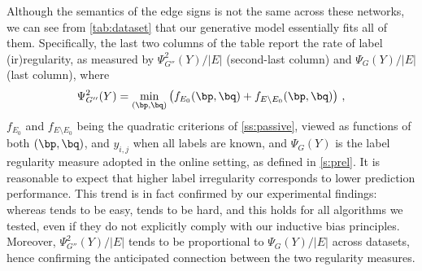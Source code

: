 Although the semantics of the edge signs is not the same across these networks, we can see from
\autoref{tab:dataset} that our generative model essentially fits all of them. Specifically, the last
two columns of the table report the rate of label (ir)regularity, as measured by
$\Psi^2_{G''}(Y)/|E|$ (second-last column) and $\Psi_{G}(Y)/|E|$ (last column), where 
\[
\Psi^2_{G''}(Y) = \min_{(\bp,\bq)} \left(f_{E_0}(\bp,\bq) + f_{E\setminus E_0}(\bp,\bq)\right)\,,
\]
$f_{E_0}$ and $f_{E\setminus E_0}$ being the quadratic criterions of \autoref{ss:passive}, viewed as
functions of both $(\bp,\bq)$, and $y_{i,j}$ when all labels are known, and $\Psi_{G}(Y)$ is the
label regularity measure adopted in the online setting, as defined in \autoref{s:prel}. It is
reasonable to expect that higher label irregularity corresponds to lower prediction performance.
This trend is in fact confirmed by our experimental findings: whereas \epi{} tends to be easy,
\aut{} tends to be hard, and this holds for all algorithms we tested, even if they do not explicitly
comply with our inductive bias principles. Moreover, $\Psi^2_{G''}(Y)/|E|$ tends to be proportional
to $\Psi_{G}(Y)/|E|$ across datasets, hence confirming the anticipated connection between the two
regularity measures.

\iffalse
***********************************************************************
Finally, there is a low fraction of reciprocal (or \emph{twin}) edges (i.e.\
$\eij \in E$ and $\eji \in E$, which is a common mechanism of link formation in
directed networks~\cite{DirectedReciprocity04}), and in most cases they do not
disagree, meaning they have the same sign. In practice, we use that fact to
improve our accuracy at no additional computational cost: when predicting $\eij
\in E_{\mathrm{test}}$, if the reciprocal edge \eji{} is part of the training set, we
set $\sgn(\eij) = \sgn(\eji)$.

from http://www.nature.com/articles/srep02729

The study of link reciprocity in binary directed networks1,2, or the tendency
of vertex pairs to form mutual connections, has received an increasing
attention in recent years3,4,5,6,7,8,9,10,11,12,13,14. Among other things,
reciprocity has been shown to be crucial in order to classify3 and model4
directed networks, understand the effects of network structure on dynamical
processes (e.g. diffusion or percolation processes5,6,7), explain patterns of
growth in out-of-equilibrium networks (as in the case of the Wikipedia8 or the
World Trade Web9,10), and study the onset of higher-order structures such as
correlations11,12 and triadic motifs13,14,15,16
************************************************************************
\fi

